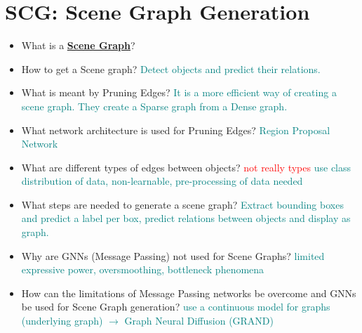 \documentclass{report}
\newcommand{\asw}[2][teal]{}
\renewcommand{\asw}[2][teal]{\textcolor{#1}{#2}}
\newcommand{\qst}[2][red]{\textcolor{#1}{#2}}
\begin{document}
	\section{SCG: Scene Graph Generation}
	
	\begin{itemize}
	\item What is a \textbf{\underline{Scene Graph}}?
	\asw{\newline }
	\item How to get a Scene graph?
	\asw{\newline Detect objects and predict their relations.}
	\item What is meant by Pruning Edges?
	\asw{\newline It is a more efficient way of creating a scene graph. They create a Sparse graph from a Dense graph.}
	\item What network architecture is used for Pruning Edges?
	\asw{\newline Region Proposal Network}
	\item What are different types of edges between objects? \qst{not really types}
	\asw{\newline use class distribution of data, non-learnable, pre-processing of data needed}
	\item What steps are needed to generate a scene graph?
	\asw{\newline Extract bounding boxes and predict a label per box, predict relations between objects and display as graph.}
	\item Why are GNNs (Message Passing) not used for Scene Graphs?
	\asw{\newline limited expressive power, oversmoothing, bottleneck phenomena}
	\item How can the limitations of Message Passing networks be overcome and GNNs be used for Scene Graph generation?
	\asw{\newline use a continuous model for graphs (underlying graph) $\rightarrow$ Graph Neural Diffusion (GRAND)}
	

\end{itemize}
\end{document}
